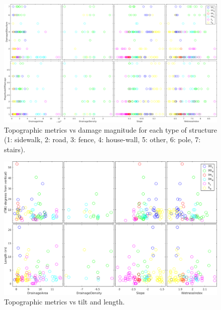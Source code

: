 \documentclass[final,12pt,times,twocolumn,authoryear]{elsarticle}
\begin{document}
\begin{figure}[hbt]
	\centering
	\includegraphics[width=\linewidth]{fig/topomaps_vs_damagemag_strut}
	\caption{Topographic metrics vs damage magnitude for each type of structure (1: sidewalk, 2: road, 3: fence, 4: house-wall, 5: other, 6: pole, 7: stairs).}
	\label{fig:topodmgsww}
\end{figure}

\begin{figure}[hbt]
	\centering
	\includegraphics[width=\linewidth]{fig/plotmatrix_topo_vs_tilt_length_all_sites}
	\caption{Topographic metrics vs tilt and length.}
	\label{fig:topotiltlen}
\end{figure}
\end{document}
